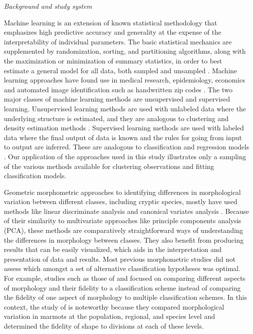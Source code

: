 \documentclass[12pt,letterpaper]{article}
\renewcommand{\subsection}[1]{%
\bigskip
\begin{center}
\begin{large}
\normalfont\itshape #1
\end{large}
\end{center}}
\begin{document}
\subsection{Background and study system}
Machine learning is an extension of known statistical methodology \citep{Hastie2009} that emphasizes high predictive accuracy and generality at the expense of the interpretability of individual parameters. The basic statistical mechanics are supplemented by randomization, sorting, and partitioning algorithms, along with the maximization or minimization of summary statistics, in order to best estimate a general model for all data, both sampled and unsampled \citep{Hastie2009}. Machine learning approaches have found use in medical research, epidemiology, economics and automated image identification such as handwritten zip codes \citep{Hastie2009}. The two major classes of machine learning methods are unsupervised and supervised learning. Unsupervised learning methods are used with unlabeled data where the underlying structure is estimated, and they are analogous to clustering and density estimation methods \citep{Kaufman1990}. Supervised learning methods are used with labeled data where the final output of data is known and the rules for going from input to output are inferred. These are analogous to classification and regression models \citep{Breiman1984}. Our application of the approaches used in this study illustrates only a sampling of the various methods available for clustering observations and fitting classification models. 

Geometric morphometric approaches to identifying differences in morphological variation between different classes, including cryptic species, mostly have used methods like linear discriminate analysis and canonical variates analysis \citep{Polly2003,Zelditch2004,Gaubert2005b,Gunduz2007,Polly2007a,Francoy2009,Sztencel-Jabonka2009,MitrovskiBogdanovic2013}. Because of their similarity to multivariate approaches like principle components analysis (PCA), these methods are comparatively straightforward ways of understanding the differences in morphology between classes. They also benefit from producing results that can be easily visualized, which aids in the interpretation and presentation of data and results. Most previous morphometric studies did not assess which amongst a set of alternative classification hypotheses was optimal. For example, studies such as those of \citet{Caumul2005a} and \citet{Polly2007a} focused on comparing different aspects of morphology and their fidelity to a classification scheme instead of comparing the fidelity of one aspect of morphology to multiple classification schemes. In this context, the study of \citet{Cardini2009a} is noteworthy because they compared morphological variation in marmots at the population, regional, and species level and determined the fidelity of shape to divisions at each of these levels.
\end{document}
